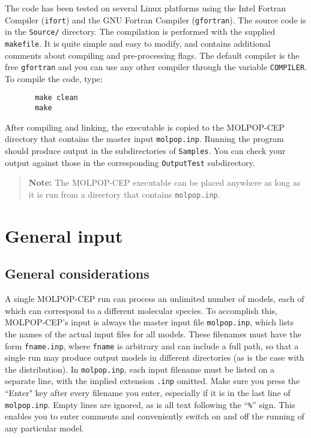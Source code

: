 \documentclass[12pt]{article}
\begin{document}
The code has been tested on several Linux platforms using the Intel Fortran
Compiler (\texttt{ifort}) and the GNU Fortran Compiler (\texttt{gfortran}). The
source code is in the \texttt{Source/} directory. The compilation is performed
with the supplied \texttt{makefile}. It is quite simple and easy to modify, and
contains additional comments about compiling and pre-processing flags. The
default compiler is the free \texttt{gfortran} and you can use any other
compiler through the variable \texttt{COMPILER}. To compile the code, type:
\begin{verbatim}
       make clean
       make
\end{verbatim}
After compiling and linking, the executable is copied to the MOLPOP-CEP
directory that contains the master input \texttt{molpop.inp}. Running the
program should produce output in the subdirectories of {\tt Samples}. You can
check your output against those in the corresponding {\tt OutputTest}
subdirectory.

\begin{quote}
{\bf Note:} The MOLPOP-CEP executable can be placed anywhere as long as it is
run from a directory that contains \texttt{molpop.inp}.
\end{quote}


\section{General input}


\subsection{General considerations}
A single MOLPOP-CEP run can process an unlimited number of models, each of which
can correspond to a different molecular species. To accomplish this, MOLPOP-CEP's
input is always the master input file \texttt{molpop.inp}, which lists the names of the
actual input files for all models. These filenames must have the form
\texttt{fname.inp}, where \texttt{fname} is arbitrary and can include a full path, so that a
single run may produce output models in different directories (as is the case
with the distribution). In \texttt{molpop.inp}, each input filename must be listed on a
separate line, with the implied extension \texttt{.inp} omitted. Make sure you press the
``Enter" key after every filename you enter, especially if it is in the last
line of \texttt{molpop.inp}. Empty lines are ignored, as is all text following the ``\texttt{\%}''
sign. This enables you to enter comments and conveniently switch on
and off the running of any particular model.
\end{document}
